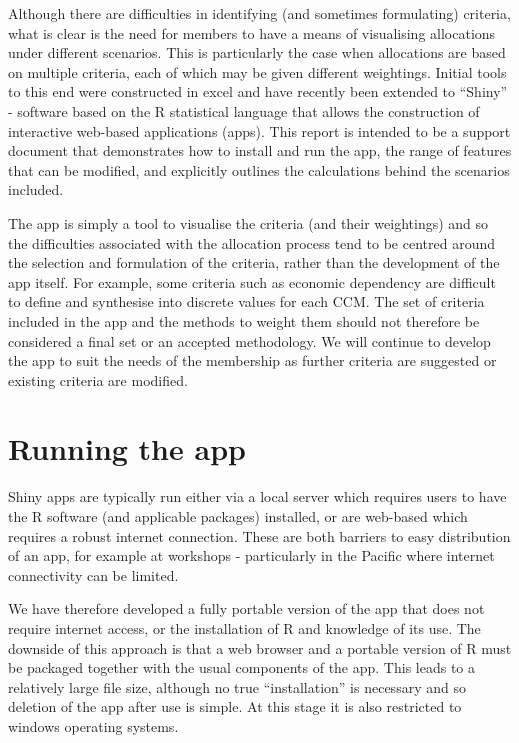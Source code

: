 \documentclass[11pt]{article}
\begin{document}
Although there are difficulties in identifying (and sometimes formulating) criteria, what is clear is the need for members to have a means of visualising allocations under different scenarios. This is particularly the case when allocations are based on multiple criteria, each of which may be given different weightings. Initial tools to this end were constructed in excel and have recently been extended to ``Shiny'' - software based on the R statistical language that allows the construction of interactive web-based applications (apps). This report is intended to be a support document that demonstrates how to install and run the app, the range of features that can be modified, and explicitly outlines the calculations behind the scenarios included.

The app is simply a tool to visualise the criteria (and their weightings) and so the difficulties associated with the allocation process tend to be centred around the selection and formulation of the criteria, rather than the development of the app itself. For example, some criteria such as economic dependency are difficult to define and synthesise into discrete values for each CCM. The set of criteria included in the app and the methods to weight them should not therefore be considered a final set or an accepted methodology. We will continue to develop the app to suit the needs of the membership as further criteria are suggested or existing criteria are modified.

\section{Running the app}
Shiny apps are typically run either via a local server which requires users to have the R software (and applicable packages) installed, or are web-based which requires a robust internet connection. These are both barriers to easy distribution of an app, for example at workshops - particularly in the Pacific where internet connectivity can be limited.

We have therefore developed a fully portable version of the app that does not require internet access, or the installation of R and knowledge of its use. The downside of this approach is that a web browser and a portable version of R must be packaged together with the usual components of the app. This leads to a relatively large file size, although  no true ``installation'' is necessary and so deletion of the app after use is simple. At this stage it is also restricted to windows operating systems. 
\end{document}
